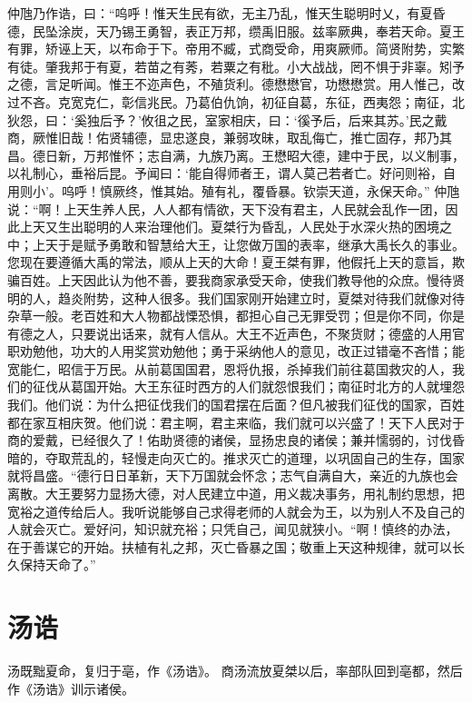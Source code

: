 \documentclass[a4paper,12pt,UTF8,twoside]{ctexbook}
\begin{document}
仲虺乃作诰，曰：“呜呼！惟天生民有欲，无主乃乱，惟天生聪明时乂，有夏昏德，民坠涂炭，天乃锡王勇智，表正万邦，缵禹旧服。兹率厥典，奉若天命。夏王有罪，矫诬上天，以布命于下。帝用不臧，式商受命，用爽厥师。简贤附势，实繁有徒。肇我邦于有夏，若苗之有莠，若粟之有秕。小大战战，罔不惧于非辜。矧予之德，言足听闻。惟王不迩声色，不殖货利。德懋懋官，功懋懋赏。用人惟己，改过不吝。克宽克仁，彰信兆民。乃葛伯仇饷，初征自葛，东征，西夷怨；南征，北狄怨，曰：‘奚独后予？’攸徂之民，室家相庆，曰：‘徯予后，后来其苏。’民之戴商，厥惟旧哉！佑贤辅德，显忠遂良，兼弱攻昧，取乱侮亡，推亡固存，邦乃其昌。德日新，万邦惟怀；志自满，九族乃离。王懋昭大德，建中于民，以义制事，以礼制心，垂裕后昆。予闻曰：‘能自得师者王，谓人莫己若者亡。好问则裕，自用则小’。呜呼！慎厥终，惟其始。殖有礼，覆昏暴。钦崇天道，永保天命。”
仲虺说：“啊！上天生养人民，人人都有情欲，天下没有君主，人民就会乱作一团，因此上天又生出聪明的人来治理他们。夏桀行为昏乱，人民处于水深火热的困境之中；上天于是赋予勇敢和智慧给大王，让您做万国的表率，继承大禹长久的事业。您现在要遵循大禹的常法，顺从上天的大命！夏王桀有罪，他假托上天的意旨，欺骗百姓。上天因此认为他不善，要我商家承受天命，使我们教导他的众庶。慢待贤明的人，趋炎附势，这种人很多。我们国家刚开始建立时，夏桀对待我们就像对待杂草一般。老百姓和大人物都战慄恐惧，都担心自己无罪受罚；但是你不同，你是有德之人，只要说出话来，就有人信从。大王不近声色，不聚货财；德盛的人用官职劝勉他，功大的人用奖赏劝勉他；勇于采纳他人的意见，改正过错毫不吝惜；能宽能仁，昭信于万民。从前葛国国君，恩将仇报，杀掉我们前往葛国救灾的人，我们的征伐从葛国开始。大王东征时西方的人们就怨恨我们；南征时北方的人就埋怨我们。他们说：为什么把征伐我们的国君摆在后面？但凡被我们征伐的国家，百姓都在家互相庆贺。他们说：君主啊，君主来临，我们就可以兴盛了！天下人民对于商的爱戴，已经很久了！佑助贤德的诸侯，显扬忠良的诸侯；兼并懦弱的，讨伐昏暗的，夺取荒乱的，轻慢走向灭亡的。推求灭亡的道理，以巩固自己的生存，国家就将昌盛。“德行日日革新，天下万国就会怀念；志气自满自大，亲近的九族也会离散。大王要努力显扬大德，对人民建立中道，用义裁决事务，用礼制约思想，把宽裕之道传给后人。我听说能够自己求得老师的人就会为王，以为别人不及自己的人就会灭亡。爱好问，知识就充裕；只凭自己，闻见就狭小。“啊！慎终的办法，在于善谋它的开始。扶植有礼之邦，灭亡昏暴之国；敬重上天这种规律，就可以长久保持天命了。”

\chapter{汤诰}

汤既黜夏命，复归于亳，作《汤诰》。
商汤流放夏桀以后，率部队回到亳都，然后作《汤诰》训示诸侯。
\end{document}
